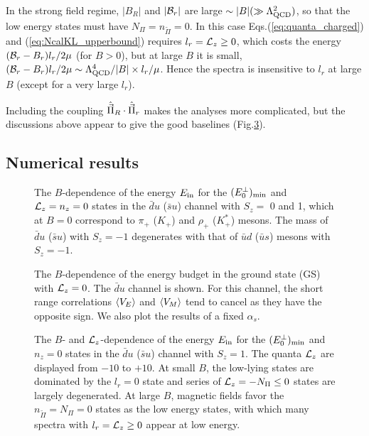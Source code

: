 In the strong field regime, $|B_R| $ and $|\mathcal{B}_r|$ are large $\sim |B| (\gg \Lambda_{\rm QCD}^2)$, so that the low energy states must have $N_\Pi=n_{\tilde{\Pi}} =0$. 
In this case Eqs.(\ref{eq:quanta_charged}) and (\ref{eq:NcalKL_upperbound}) requires 
$l_r = \mathcal{L}_z \ge 0$, which costs the energy $ (\mathcal{B}_r - B_r) l_r/2\mu$ (for $B>0$), but at large $B$ it is small,
$ (\mathcal{B}_r - B_r) l_r/2\mu \sim  \Lambda_{\rm QCD}^4/|B| \times l_r/\mu$.
Hence the spectra is insensitive to $l_r$ at large $B$ (except for a very large $l_r$). 

Including the coupling $\hat{ \vec{\Pi}}_R \cdot \hat{\vec{\Pi}}_r $ makes the analyses more complicated,
but the discussions above appear to give the good baselines (Fig.\ref{fig:charged_excited_calL}).  




\subsection{Numerical results}
\label{sec:numerical_charged}

\begin{figure}[thb]
\caption{ %
The $B$-dependence of the energy $E_{\rm in}$ for the $ (E_0^{\perp } )_{\rm min}$ and $ \mathcal{L}_z = n_z = 0$ states in the $\bar{d}u$ ($\bar{s}u$) channel with $S_z=$ 0 and 1, which at $B=0$ correspond to $\pi_+$ ($K_+$) and $\rho_+$ ($K^*_+$) mesons. The mass of $\bar{d} u$ ($\bar{s}u$) with $S_z=-1$ degenerates with that of $\bar{u}d$ ($\bar{u}s$) mesons with $S_z=-1$. }
\label{fig:charged_GS}       
\end{figure}

\begin{figure}
\caption{ 
The $B$-dependence of the energy budget in the ground state (GS) with $\mathcal{L}_z=0$. The $\bar{d}u$ channel is shown.
For this channel, the short range correlations $\langle V_E \rangle$ and $\langle V_M \rangle$ tend to cancel as they have the opposite sign.
 We also plot the results of a fixed $\alpha_s$. 
}
\label{fig:charged_Lz0_energy_budget}       
\end{figure}


\begin{figure}[thb]
\caption{ 
The $B$- and $\mathcal{L}_z$-dependence of the energy $E_{\rm in}$ for the $ (E_0^{\perp } )_{\rm min}$  and $n_z = 0$ states in the $\bar{d}u$ ($\bar{s}u$) channel with $S_z= 1$. 
The quanta $\mathcal{L}_z$ are displayed from $-10$ to $+10$. At small $B$, the low-lying states are dominated by the $l_r=0$ state and series of 
$\mathcal{L}_z = - N_\Pi \le 0$ 
states are largely degenerated. At large $B$, magnetic fields favor the $n_{\tilde{\Pi} }= N_\Pi =0$ states as the low energy states, with which many spectra with  $l_r = \mathcal{L}_z \ge 0$ appear at low energy.
}
\label{fig:charged_excited_calL}       
\end{figure}





